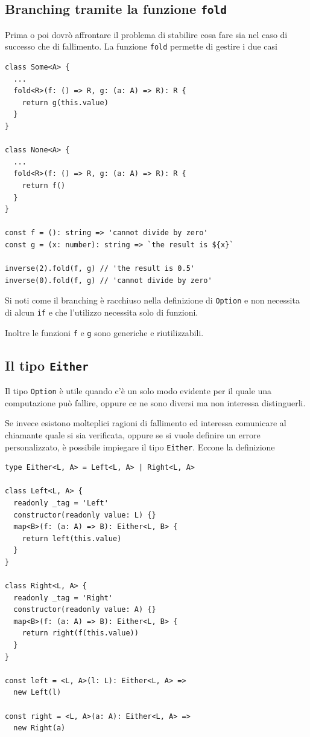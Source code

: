\documentclass[12pt]{article}
\begin{document}
\subsection{Branching tramite la funzione \texttt{fold}}

Prima o poi dovrò affrontare il problema di stabilire cosa fare sia nel caso di successo che di fallimento.
La funzione \texttt{fold} permette di gestire i due casi

\begin{verbatim}
class Some<A> {
  ...
  fold<R>(f: () => R, g: (a: A) => R): R {
    return g(this.value)
  }
}

class None<A> {
  ...
  fold<R>(f: () => R, g: (a: A) => R): R {
    return f()
  }
}

const f = (): string => 'cannot divide by zero'
const g = (x: number): string => `the result is ${x}`

inverse(2).fold(f, g) // 'the result is 0.5'
inverse(0).fold(f, g) // 'cannot divide by zero'
\end{verbatim}

Si noti come il branching è racchiuso nella definizione di \texttt{Option} e non necessita di alcun \texttt{if}
e che l'utilizzo necessita solo di funzioni.

Inoltre le funzioni \texttt{f} e \texttt{g} sono generiche e riutilizzabili.

\subsection{Il tipo \texttt{Either}}

Il tipo \texttt{Option} è utile quando c'è un solo modo evidente per il quale una computazione può fallire,
oppure ce ne sono diversi ma non interessa distinguerli.

Se invece esistono molteplici ragioni di fallimento ed interessa comunicare al chiamante quale si sia verificata,
oppure se si vuole definire un errore personalizzato, è possibile impiegare il tipo \texttt{Either}. Eccone la definizione

\begin{verbatim}
type Either<L, A> = Left<L, A> | Right<L, A>

class Left<L, A> {
  readonly _tag = 'Left'
  constructor(readonly value: L) {}
  map<B>(f: (a: A) => B): Either<L, B> {
    return left(this.value)
  }
}

class Right<L, A> {
  readonly _tag = 'Right'
  constructor(readonly value: A) {}
  map<B>(f: (a: A) => B): Either<L, B> {
    return right(f(this.value))
  }
}

const left = <L, A>(l: L): Either<L, A> =>
  new Left(l)

const right = <L, A>(a: A): Either<L, A> =>
  new Right(a)
\end{verbatim}
\end{document}
